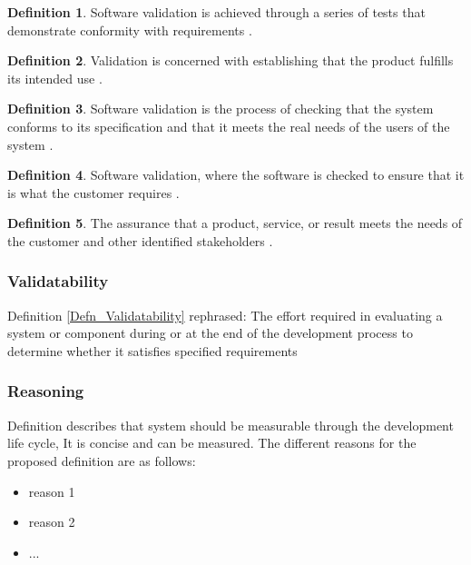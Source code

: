 \documentclass[letterpaper, cleveref]{lipics-v2019}
\theoremstyle{definition}
\newtheorem{defn}{Definition}
\begin{document}
\begin{defn}
  Software validation is achieved through a series of tests that demonstrate
  conformity with requirements \citep{pressman2005software}.
\end{defn}

\begin{defn}
	Validation is concerned with establishing that the product fulfills its
	intended use \citep{van2008software}.
\end{defn}

\begin{defn}
  Software validation is the process of checking that the system conforms to
  its specification and that it meets the real needs of the users of the
  system \citep{sommerville}. %
\end{defn}

\begin{defn}
	Software validation, where the software is checked to ensure that it is
  what the customer requires \citep{sommerville}. %
\end{defn}

\begin{defn}
  The assurance that a product, service, or result meets the needs of the
  customer and other identified stakeholders \citep{project2017guide}.
\end{defn}

\begin{mybox}
\subsubsection*{Validatability}
Definition \ref{Defn_Validatability} rephrased:  The effort required in
evaluating a system or component during or at the end of the development
process to determine whether it satisfies specified requirements
\end{mybox}

\subsubsection*{Reasoning}

Definition describes that system should be measurable through the
development life cycle, It is concise and can be measured.  The
different reasons for the proposed definition are as follows:

\begin{itemize}
  \item reason 1
  \item reason 2
  \item ...
\end{itemize}
\end{document}
